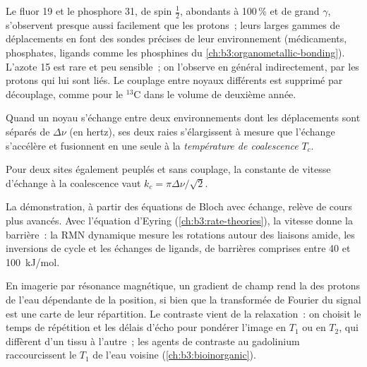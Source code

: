 Le fluor 19 et le phosphore 31, de spin $\frac12$, abondants à 100\,\% et
de grand
$\gamma$, s'observent presque aussi facilement que les protons~; leurs
larges gammes de déplacements en font des sondes précises de leur
environnement (médicaments, phosphates, ligands comme les phosphines du
\cref{ch:b3:organometallic-bonding}). L'azote 15 est rare et peu
sensible~; on l'observe en général indirectement, par les protons qui
lui sont liés. Le couplage entre noyaux différents est supprimé par
découplage, comme pour le ${}^{13}$C dans le volume de deuxième année.

\begin{definition}\label{def:b3:advanced-nmr:coalescence}
Quand un noyau s'échange entre deux environnements dont les déplacements
sont séparés de $\Delta\nu$ (en hertz), ses deux raies s'élargissent à
mesure que l'échange s'accélère et fusionnent en une seule à la
\emph{température de coalescence}
$T_c$.
\end{definition}

\begin{proposition}\label{prop:b3:advanced-nmr:coalescence}
Pour deux sites également peuplés et sans couplage, la constante de
vitesse d'échange à la coalescence vaut $k_c = \pi\Delta\nu/\sqrt2$.
\end{proposition}
\admitted

La démonstration, à partir des équations de Bloch avec échange, relève de
cours plus avancés. Avec l'équation d'Eyring (\cref{ch:b3:rate-theories}),
la vitesse donne la barrière~: la RMN dynamique mesure les rotations
autour des liaisons amide, les inversions de cycle et les échanges de
ligands, de barrières comprises entre 40 et \qty{100}{kJ/mol}.

\begin{example}\label{ex:b3:advanced-nmr:mri}
En imagerie par résonance magnétique, un gradient de champ rend la
 des protons de l'eau dépendante de la position, si
bien que la transformée de Fourier du signal est une carte de leur
répartition. Le contraste vient de la relaxation~: on choisit le temps de
répétition et les délais d'écho pour pondérer l'image en $T_1$ ou en
$T_2$, qui diffèrent d'un tissu à l'autre~; les agents de contraste au
gadolinium raccourcissent le $T_1$ de l'eau voisine
(\cref{ch:b3:bioinorganic}).
\end{example}

